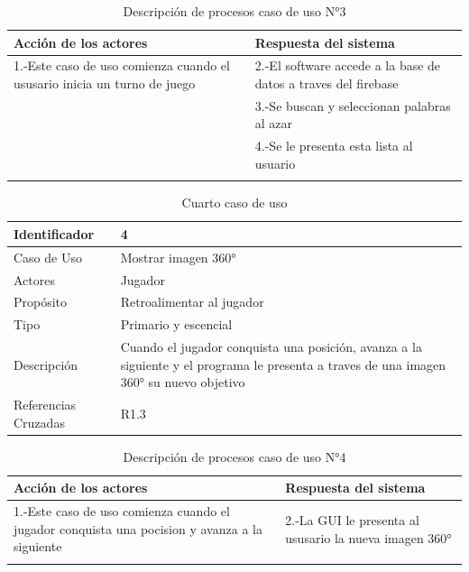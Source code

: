 \begin{longtable}[H]{| m{8cm} | m{8cm} |}
\hline 
\textbf{Acción de los actores} & \textbf{Respuesta del sistema}\\
\hline 
1.-Este caso de uso comienza cuando el ususario inicia un turno de juego & 2.-El software accede a la base de datos a traves del firebase\\
\hline
& 3.-Se buscan y seleccionan palabras al azar\\
\hline
& 4.-Se le presenta esta lista al usuario\\
\hline
\caption{Descripción de procesos caso de uso N°3}
\end{longtable}

\begin{table}[H]
    \begin{center}
        \begin{tabular}{| l | m{12cm} |}        
        	\hline 
        	Identificador & 4\\
        	\hline
        	Caso de Uso & Mostrar imagen 360°\\
        	\hline
        	Actores & Jugador\\
        	\hline
        	Propósito & Retroalimentar al jugador \\
        	\hline
        	Tipo & Primario y escencial\\
        	\hline
        	Descripción & Cuando el jugador conquista una posición, avanza a la siguiente y el programa le presenta a traves de una imagen 360° su nuevo objetivo\\
        	\hline
        	Referencias Cruzadas & R1.3\\
        	\hline
        \end{tabular}
    \caption{Cuarto caso de uso}
    \label{Caso_de_uso_4}
    \end{center}
\end{table}

\begin{longtable}[H]{| m{8cm} | m{8cm} |}
\hline 
\textbf{Acción de los actores} & \textbf{Respuesta del sistema}\\
\hline 
1.-Este caso de uso comienza cuando el jugador conquista una pocision y avanza a la siguiente & 2.-La GUI le presenta al ususario la nueva imagen 360°\\
\hline 
\caption{Descripción de procesos caso de uso N°4}
\end{longtable}

